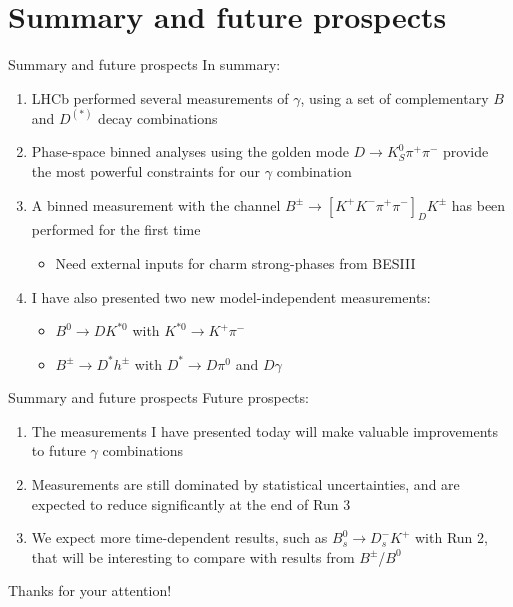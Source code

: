 \documentclass[xcolor={dvipsnames}]{beamer}
\begin{document}
\section{Summary and future prospects}
\begin{frame}{Summary and future prospects}
  \vspace{0.0cm}
  {\Large In summary:}
  \vspace{0.3cm}
  \begin{enumerate}
    \setlength\itemsep{1.0em}
    \item{LHCb performed several measurements of $\gamma$, using a set of complementary $B$ and $D^{(*)}$ decay combinations}
    \item{Phase-space binned analyses using the golden mode $D\to K_S^0\pi^+\pi^-$ provide the most powerful constraints for our $\gamma$ combination}
    \item{A binned measurement with the channel $B^\pm\to[K^+K^-\pi^+\pi^-]_DK^\pm$ has been performed for the first time}
    \begin{itemize}
      \item{Need external inputs for charm strong-phases from BESIII}
    \end{itemize}
    \item{I have also presented two new model-independent measurements:}
    \begin{itemize}
      \item{$B^0\to DK^{*0}$ with $K^{*0}\to K^+\pi^-$}
      \item{$B^\pm\to D^{*}h^\pm$ with $D^*\to D\pi^0$ and $D\gamma$}
    \end{itemize}
  \end{enumerate}
\end{frame}

\begin{frame}{Summary and future prospects}
  \vspace{0.0cm}
  {\Large Future prospects:}
  \vspace{0.3cm}
  \begin{enumerate}
    \setlength\itemsep{1.0em}
    \item{The measurements I have presented today will make valuable improvements to future $\gamma$ combinations}
    \item{Measurements are still dominated by statistical uncertainties, and are expected to reduce significantly at the end of Run 3}
    \item{We expect more time-dependent results, such as $B_s^0\to D_s^-K^+$ with Run 2, that will be interesting to compare with results from $B^\pm$/$B^0$}
    \end{enumerate}
    \vspace{1.0cm}
  \begin{center}
    {\huge Thanks for your attention!}
  \end{center}
\end{frame}
\end{document}
